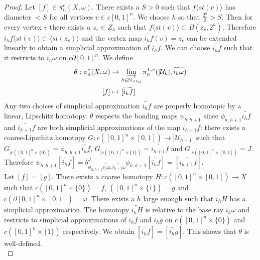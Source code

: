 \documentclass[a4paper,11pt]{article}
\theoremstyle{definition}
\theoremstyle{plain}
\theoremstyle{remark}
\begin{document}
{\begin{proof}
Let $[f]\in \pi_{n}^{c}(X,\omega)$. There exists a $S>0$ such that $f \langle st(v) \rangle$ has diameter $<S$ for all vertices $v \in c[0,1]^n$. We choose $h$ so that $\frac{2^h}{2}>S$. Then for every vertex $v$ there exists a $z_{v} \in Z_{h}$ such that $f \langle st(v) \rangle \subset B(z_{v},2^h)$. Therefore $i_{h}f \langle st(v) \rangle \subset \langle st(z_{v}) \rangle$ and the vertex map $\widetilde{i_{h}f}(v) = z_{v}$ can be extended linearly to obtain a simplicial approximation of $i_{h}f$. We can choose $\widetilde{i_{h}f}$ such that it restricts to $\widetilde{i_{h}\omega}$ on $c\partial[0,1]^n$. We define 
\begin{align*}
 \theta: \pi_{n}^{c}(X,\omega) &\rightarrow \varinjlim_{h\in \mathbb{N}_{\geq h_0}}\pi^{L,e}_{n}(|\mathcal{U}_{h}|, \widetilde{i_{h}\omega})\\
[f] &\mapsto [\widetilde{i_{h} f}]
\end{align*}
Any two choices of simplicial approximation $\widetilde{i_{h} f}$ are properly homotopic by a linear, Lipschitz homotopy. $\theta$ respects the bonding maps $\psi_{h,h+1}$ since $\phi_{h,h+1}\widetilde{i_{h}f}$ and $\widetilde{i_{h+1}f}$ are both simplicial approximations of the map $i_{h+1}f$: there exists a coarse-Lipschitz homotopy $G: c([0,1]^n \times [0,1]) \rightarrow |\mathcal{U}_{h+1}|$ such that $G_{| c([0,1]^n \times \{0\})} = \phi_{h,h+1}\widetilde{i_{h}f}$, $G_{| c([0,1]^n \times \{1\})} =\widetilde{i_{h+1}f}$ and $G_{| c([0,1]^n \times [0,1])} = J$. Therefore $\psi_{h,h+1}[\widetilde{i_{h}f}] = b^{J}_{\phi_{h,h+1} \widetilde{i_{h}\omega}, \widetilde{i_{h+1}\omega}}\phi_{h,h+1}[\widetilde{i_{h}f}] = [\widetilde{i_{h+1}f}]$. \\

Let $[f] = [g]$. There exists a coarse homotopy $H: c([0,1]^n \times [0,1])\rightarrow X$ such that $c([0,1]^n \times \{0\}) = f$, $([0,1]^n \times \{1\}) = g$ and $c(\partial [0,1]^n \times [0,1]) = \omega$. There exists a $h$ large enough such that $i_{h}H$ has a simplicial approximation. The homotopy $\widetilde{i_{h}H}$ is relative to the base ray $\widetilde{i_{h}\omega}$ and restricts to simplicial approximations of $i_{h}f$ and $i_{h}g$ on $c([0,1]^n \times \{0\})$ and $c([0,1]^n \times \{1\})$ respectively. We obtain $[\widetilde{i_{h}f}] = [\widetilde{i_{h}g}]$. This shows that $\theta$ is well-defined.\\


\end{proof}}
\end{document}
